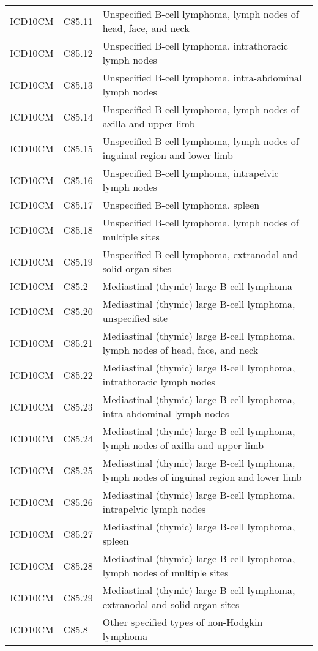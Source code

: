 \begin{longtable}{p{}p{}p{}}
  ICD10CM & C85.11 & Unspecified B-cell lymphoma, lymph nodes of head, face, and neck \\ 
  ICD10CM & C85.12 & Unspecified B-cell lymphoma, intrathoracic lymph nodes \\ 
  ICD10CM & C85.13 & Unspecified B-cell lymphoma, intra-abdominal lymph nodes \\ 
  ICD10CM & C85.14 & Unspecified B-cell lymphoma, lymph nodes of axilla and upper limb \\ 
  ICD10CM & C85.15 & Unspecified B-cell lymphoma, lymph nodes of inguinal region and lower limb \\ 
  ICD10CM & C85.16 & Unspecified B-cell lymphoma, intrapelvic lymph nodes \\ 
  ICD10CM & C85.17 & Unspecified B-cell lymphoma, spleen \\ 
  ICD10CM & C85.18 & Unspecified B-cell lymphoma, lymph nodes of multiple sites \\ 
  ICD10CM & C85.19 & Unspecified B-cell lymphoma, extranodal and solid organ sites \\ 
  ICD10CM & C85.2 & Mediastinal (thymic) large B-cell lymphoma \\ 
  ICD10CM & C85.20 & Mediastinal (thymic) large B-cell lymphoma, unspecified site \\ 
  ICD10CM & C85.21 & Mediastinal (thymic) large B-cell lymphoma, lymph nodes of head, face, and neck \\ 
  ICD10CM & C85.22 & Mediastinal (thymic) large B-cell lymphoma, intrathoracic lymph nodes \\ 
  ICD10CM & C85.23 & Mediastinal (thymic) large B-cell lymphoma, intra-abdominal lymph nodes \\ 
  ICD10CM & C85.24 & Mediastinal (thymic) large B-cell lymphoma, lymph nodes of axilla and upper limb \\ 
  ICD10CM & C85.25 & Mediastinal (thymic) large B-cell lymphoma, lymph nodes of inguinal region and lower limb \\ 
  ICD10CM & C85.26 & Mediastinal (thymic) large B-cell lymphoma, intrapelvic lymph nodes \\ 
  ICD10CM & C85.27 & Mediastinal (thymic) large B-cell lymphoma, spleen \\ 
  ICD10CM & C85.28 & Mediastinal (thymic) large B-cell lymphoma, lymph nodes of multiple sites \\ 
  ICD10CM & C85.29 & Mediastinal (thymic) large B-cell lymphoma, extranodal and solid organ sites \\ 
  ICD10CM & C85.8 & Other specified types of non-Hodgkin lymphoma \\ 

\end{longtable}
